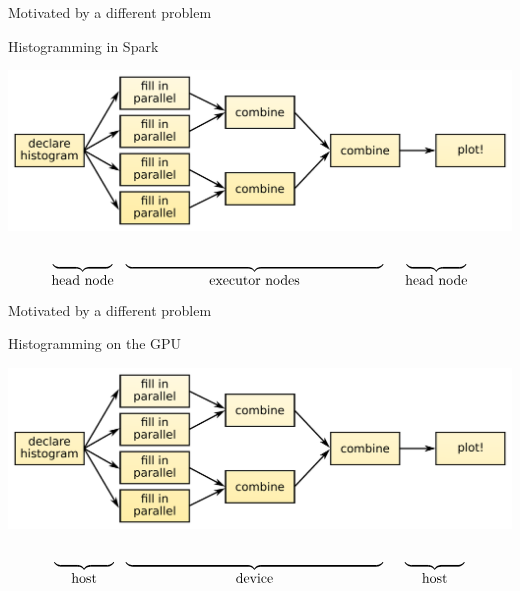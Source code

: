 \documentclass{beamer}
\begin{document}
\begin{frame}{Motivated by a different problem}

\begin{block}{Histogramming in Spark}
\end{block}

\includegraphics[width=\linewidth]{parallelization.pdf}

\vspace{-1 cm}
\[ \underbrace{\mbox{\hspace{1.5 cm}}}_{\mbox{head node}} \hspace{0.25 cm} \underbrace{\mbox{\hspace{6.5 cm}}}_{\mbox{executor nodes}} \hspace{0.5 cm} \underbrace{\mbox{\hspace{1.5 cm}}}_{\mbox{head node}} \]

\end{frame}

\begin{frame}{Motivated by a different problem}

\begin{block}{Histogramming on the GPU}
\end{block}

\includegraphics[width=\linewidth]{parallelization.pdf}

\vspace{-1 cm}
\[ \underbrace{\mbox{\hspace{1.5 cm}}}_{\mbox{host}} \hspace{0.25 cm} \underbrace{\mbox{\hspace{6.5 cm}}}_{\mbox{device}} \hspace{0.5 cm} \underbrace{\mbox{\hspace{1.5 cm}}}_{\mbox{host}} \]

\end{frame}
\end{document}
